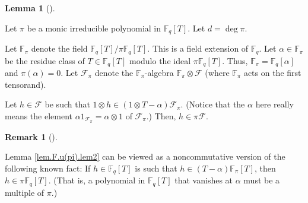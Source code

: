 \documentclass[numbers=enddot,12pt,final,onecolumn,notitlepage]{scrartcl}%
\theoremstyle{definition}
\newtheorem{lem}[theo]{Lemma}
\newenvironment{lemma}[1][]
{\begin{lem}[#1]\begin{leftbar}}
{\end{leftbar}\end{lem}}
\newtheorem{remk}[theo]{Remark}
\newenvironment{remark}[1][]
{\begin{remk}[#1]\begin{leftbar}}
{\end{leftbar}\end{remk}}
\begin{document}
\begin{lemma}
\label{lem.F.u(pi).lem2}Let $\pi$ be a monic irreducible polynomial in
$\mathbb{F}_{q}\left[  T\right]  $. Let $d=\deg\pi$.

Let $\mathbb{F}_{\pi}$ denote the field $\mathbb{F}_{q}\left[  T\right]
/\pi\mathbb{F}_{q}\left[  T\right]  $. This is a field extension of
$\mathbb{F}_{q}$. Let $\alpha\in\mathbb{F}_{\pi}$ be the residue class of
$T\in\mathbb{F}_{q}\left[  T\right]  $ modulo the ideal $\pi\mathbb{F}%
_{q}\left[  T\right]  $. Thus, $\mathbb{F}_{\pi}=\mathbb{F}_{q}\left[
\alpha\right]  $ and $\pi\left(  \alpha\right)  =0$. Let $\mathcal{F}_{\pi}$
denote the $\mathbb{F}_{\pi}$-algebra $\mathbb{F}_{\pi}\otimes\mathcal{F}$
(where $\mathbb{F}_{\pi}$ acts on the first tensorand).

Let $h\in\mathcal{F}$ be such that $1\otimes h\in\left(  1\otimes
T-\alpha\right)  \mathcal{F}_{\pi}$. (Notice that the $\alpha$ here really
means the element $\alpha1_{\mathcal{F}_{\pi}}=\alpha\otimes1$ of
$\mathcal{F}_{\pi}$.) Then, $h\in\pi\mathcal{F}$.
\end{lemma}

\begin{remark}
\label{rmk.lem.F.u(pi).lem2.exp}Lemma \ref{lem.F.u(pi).lem2} can be viewed as
a noncommutative version of the following known fact: If $h\in\mathbb{F}%
_{q}\left[  T\right]  $ is such that $h\in\left(  T-\alpha\right)
\mathbb{F}_{\pi}\left[  T\right]  $, then $h\in\pi\mathbb{F}_{q}\left[
T\right]  $. (That is, a polynomial in $\mathbb{F}_{q}\left[  T\right]  $ that
vanishes at $\alpha$ must be a multiple of $\pi$.)
\end{remark}
\end{document}
